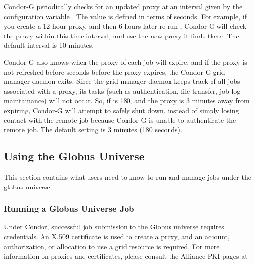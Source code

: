 Condor-G periodically checks for an updated proxy at
an interval given by the configuration variable
.
The value is defined in terms of seconds.
For example, if you create a 12-hour proxy, and then
6 hours later re-run ,
Condor-G will check the proxy within
this time interval, and use the new proxy it finds there.
The default interval is 10 minutes.

Condor-G also knows when the proxy of each job will expire,
and if the proxy is not refreshed before
seconds before the proxy expires,
the Condor-G grid manager daemon exits.
Since the grid manager daemon keeps track of all jobs
associated with a proxy, its tasks
(such as authentication, file transfer, job log maintainance)
will not occur.
So, if
is 180, and the proxy is 3 minutes away from
expiring, Condor-G will attempt to safely shut down,
instead of simply losing
contact with the remote job because Condor-G is unable to
authenticate the remote job.
The default setting is 3 minutes (180 seconds).


\subsection{\label{sec:Using-Condor-G}Using the Globus Universe}

This section contains what users need to know to 
run and manage jobs under the globus universe.

\subsubsection{\label{sec:Running-CondorG-Job}Running a Globus Universe Job}

Under Condor, successful job submission to the Globus universe requires
credentials.
An X.509 certificate is used to create a proxy,
and an account, authorization, or allocation to use a grid resource
is required.
For more information on proxies and certificates,
please consult the Alliance PKI pages at 

